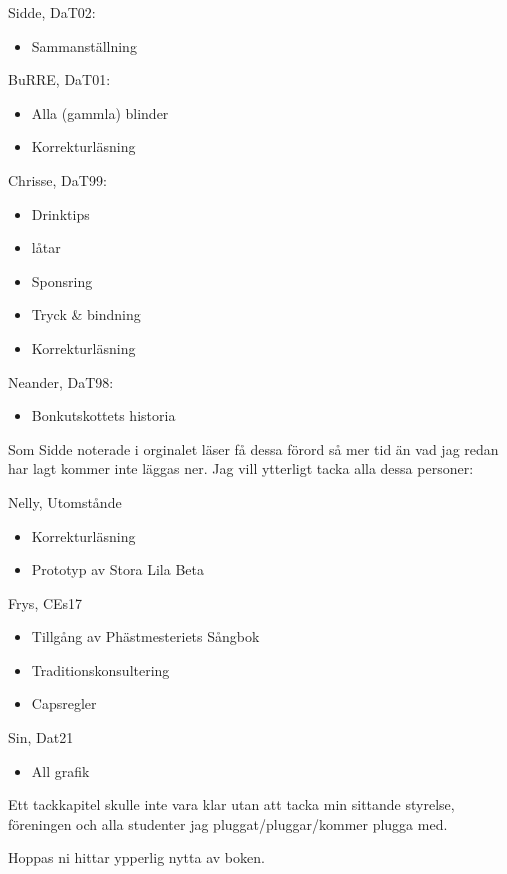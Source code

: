 Sidde, DaT02:
\begin{itemize}
  \item Sammanställning
\end{itemize}
BuRRE, DaT01:
\begin{itemize}
  \item Alla (gammla) blinder
  \item Korrekturläsning
\end{itemize}
Chrisse, DaT99:
\begin{itemize}
  \item Drinktips
  \item låtar
  \item Sponsring
  \item Tryck \& bindning
  \item Korrekturläsning
\end{itemize}
Neander, DaT98:
\begin{itemize}
  \item Bonkutskottets historia
\end{itemize}

Som Sidde noterade i orginalet läser få dessa förord så mer tid än vad jag redan
har lagt kommer inte läggas ner. Jag vill ytterligt tacka alla dessa personer:

Nelly, Utomstånde
\begin{itemize}
  \item Korrekturläsning
  \item Prototyp av Stora Lila Beta
\end{itemize}
Frys, CEs17
\begin{itemize}
  \item Tillgång av Phästmesteriets Sångbok
  \item Traditionskonsultering
  \item Capsregler
\end{itemize}
Sin, Dat21
\begin{itemize}
  \item All grafik
\end{itemize}

Ett tackkapitel skulle inte vara klar utan att tacka min sittande styrelse, föreningen och alla studenter jag pluggat/pluggar/kommer plugga med.

Hoppas ni hittar ypperlig nytta av boken.

\newpage



